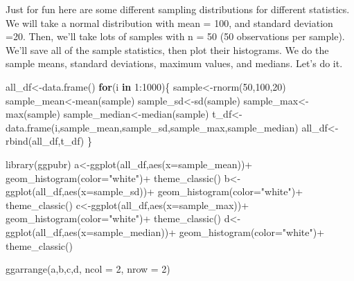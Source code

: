 \documentclass[
]{book}
\newenvironment{Shaded}{\begin{snugshade}}{\end{snugshade}}
\newcommand{\AttributeTok}[1]{\textcolor[rgb]{0.77,0.63,0.00}{#1}}
\newcommand{\ControlFlowTok}[1]{\textcolor[rgb]{0.13,0.29,0.53}{\textbf{#1}}}
\newcommand{\DecValTok}[1]{\textcolor[rgb]{0.00,0.00,0.81}{#1}}
\newcommand{\FunctionTok}[1]{\textcolor[rgb]{0.00,0.00,0.00}{#1}}
\newcommand{\NormalTok}[1]{#1}
\newcommand{\OtherTok}[1]{\textcolor[rgb]{0.56,0.35,0.01}{#1}}
\newcommand{\SpecialCharTok}[1]{\textcolor[rgb]{0.00,0.00,0.00}{#1}}
\newcommand{\StringTok}[1]{\textcolor[rgb]{0.31,0.60,0.02}{#1}}
\begin{document}
Just for fun here are some different sampling distributions for different statistics. We will take a normal distribution with mean = 100, and standard deviation =20. Then, we'll take lots of samples with n = 50 (50 observations per sample). We'll save all of the sample statistics, then plot their histograms. We do the sample means, standard deviations, maximum values, and medians. Let's do it.

\begin{Shaded}
\begin{Highlighting}[]
\NormalTok{all\_df}\OtherTok{\textless{}{-}}\FunctionTok{data.frame}\NormalTok{()}
\ControlFlowTok{for}\NormalTok{(i }\ControlFlowTok{in} \DecValTok{1}\SpecialCharTok{:}\DecValTok{1000}\NormalTok{)\{}
\NormalTok{  sample}\OtherTok{\textless{}{-}}\FunctionTok{rnorm}\NormalTok{(}\DecValTok{50}\NormalTok{,}\DecValTok{100}\NormalTok{,}\DecValTok{20}\NormalTok{)}
\NormalTok{  sample\_mean}\OtherTok{\textless{}{-}}\FunctionTok{mean}\NormalTok{(sample)}
\NormalTok{  sample\_sd}\OtherTok{\textless{}{-}}\FunctionTok{sd}\NormalTok{(sample)}
\NormalTok{  sample\_max}\OtherTok{\textless{}{-}}\FunctionTok{max}\NormalTok{(sample)}
\NormalTok{  sample\_median}\OtherTok{\textless{}{-}}\FunctionTok{median}\NormalTok{(sample)}
\NormalTok{  t\_df}\OtherTok{\textless{}{-}}\FunctionTok{data.frame}\NormalTok{(i,sample\_mean,sample\_sd,sample\_max,sample\_median)}
\NormalTok{  all\_df}\OtherTok{\textless{}{-}}\FunctionTok{rbind}\NormalTok{(all\_df,t\_df)}
\NormalTok{\}}

\FunctionTok{library}\NormalTok{(ggpubr)}
\NormalTok{a}\OtherTok{\textless{}{-}}\FunctionTok{ggplot}\NormalTok{(all\_df,}\FunctionTok{aes}\NormalTok{(}\AttributeTok{x=}\NormalTok{sample\_mean))}\SpecialCharTok{+}
  \FunctionTok{geom\_histogram}\NormalTok{(}\AttributeTok{color=}\StringTok{"white"}\NormalTok{)}\SpecialCharTok{+}
  \FunctionTok{theme\_classic}\NormalTok{()}
\NormalTok{b}\OtherTok{\textless{}{-}}\FunctionTok{ggplot}\NormalTok{(all\_df,}\FunctionTok{aes}\NormalTok{(}\AttributeTok{x=}\NormalTok{sample\_sd))}\SpecialCharTok{+}
  \FunctionTok{geom\_histogram}\NormalTok{(}\AttributeTok{color=}\StringTok{"white"}\NormalTok{)}\SpecialCharTok{+}
  \FunctionTok{theme\_classic}\NormalTok{()}
\NormalTok{c}\OtherTok{\textless{}{-}}\FunctionTok{ggplot}\NormalTok{(all\_df,}\FunctionTok{aes}\NormalTok{(}\AttributeTok{x=}\NormalTok{sample\_max))}\SpecialCharTok{+}
  \FunctionTok{geom\_histogram}\NormalTok{(}\AttributeTok{color=}\StringTok{"white"}\NormalTok{)}\SpecialCharTok{+}
  \FunctionTok{theme\_classic}\NormalTok{()}
\NormalTok{d}\OtherTok{\textless{}{-}}\FunctionTok{ggplot}\NormalTok{(all\_df,}\FunctionTok{aes}\NormalTok{(}\AttributeTok{x=}\NormalTok{sample\_median))}\SpecialCharTok{+}
  \FunctionTok{geom\_histogram}\NormalTok{(}\AttributeTok{color=}\StringTok{"white"}\NormalTok{)}\SpecialCharTok{+}
  \FunctionTok{theme\_classic}\NormalTok{()}

\FunctionTok{ggarrange}\NormalTok{(a,b,c,d,}
          \AttributeTok{ncol =} \DecValTok{2}\NormalTok{, }\AttributeTok{nrow =} \DecValTok{2}\NormalTok{)}
\end{Highlighting}
\end{Shaded}
\end{document}
